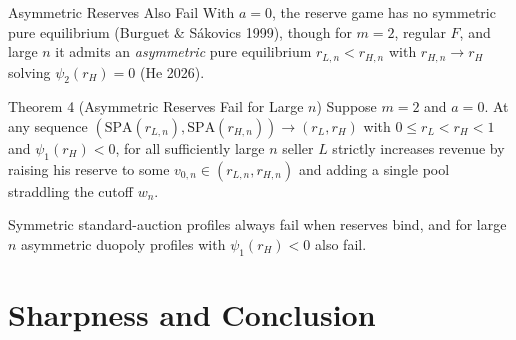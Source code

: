 \documentclass[11pt,aspectratio=169]{beamer}
\newcommand{\SPA}{\mathrm{SPA}}
\def\seg#1#2#3#4{\fill[#3,draw=InkTwo,line width=0.3pt] (#1,#4) rectangle (#2,#4+0.42);}
\begin{document}
\begin{frame}{Asymmetric Reserves Also Fail}
With $a=0$, the reserve game has no symmetric pure equilibrium (Burguet \& S\'akovics 1999), though for $m=2$, regular $F$, and large $n$ it admits an \emph{asymmetric} pure equilibrium $r_{L,n}<r_{H,n}$ with $r_{H,n}\to r_H$ solving $\psi_2(r_H)=0$ (He 2026).

\medskip
\centering
{}

\raggedright\medskip{}
\begin{block}{Theorem 4 (Asymmetric Reserves Fail for Large $n$)}
Suppose $m=2$ and $a=0$. At any sequence $(\SPA(r_{L,n}),\SPA(r_{H,n}))\to(r_L,r_H)$ with $0\le r_L<r_H<1$ and $\psi_1(r_H)<0$, for all sufficiently large $n$ seller $L$ strictly increases revenue by raising his reserve to some $v_{0,n}\in(r_{L,n},r_{H,n})$ and adding a single pool straddling the cutoff $w_n$.
\end{block}
{\footnotesize Symmetric standard-auction profiles always fail when reserves bind, and for large $n$ asymmetric duopoly profiles with $\psi_1(r_H)<0$ also fail.}
\end{frame}

\section{Sharpness and Conclusion}
\end{document}
